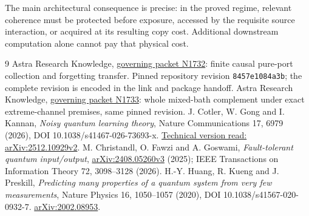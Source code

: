 \documentclass[11pt,a4paper]{article}
\begin{document}
The main architectural consequence is precise: in the proved regime, relevant coherence must be protected before exposure, accessed by the requisite source interaction, or acquired at its resulting copy cost. Additional downstream computation alone cannot pay that physical cost.

\begin{thebibliography}{9}
 Astra Research Knowledge, \href{https://github.com/harjassand/astra-research-knowledge/blob/8457e1084a3bcf3c4f8e3c7e4da9e0f5045a6570/knowledge/current/packets/N1732.json}{governing packet N1732}: finite causal pure-port collection and forgetting transfer. Pinned repository revision \texttt{8457e1084a3b}; the complete revision is encoded in the link and package handoff.
 Astra Research Knowledge, \href{https://github.com/harjassand/astra-research-knowledge/blob/8457e1084a3bcf3c4f8e3c7e4da9e0f5045a6570/knowledge/current/packets/N1733.json}{governing packet N1733}: whole mixed-bath complement under exact extreme-channel premises, same pinned revision.
 J. Cotler, W. Gong and I. Kannan, \emph{Noisy quantum learning theory}, Nature Communications 17, 6979 (2026), DOI 10.1038/s41467-026-73693-x. \href{https://arxiv.org/html/2512.10929v2}{Technical version read: arXiv:2512.10929v2}.
 M. Christandl, O. Fawzi and A. Goswami, \emph{Fault-tolerant quantum input/output}, \href{https://arxiv.org/abs/2408.05260}{arXiv:2408.05260v3} (2025); IEEE Transactions on Information Theory 72, 3098--3128 (2026).
 H.-Y. Huang, R. Kueng and J. Preskill, \emph{Predicting many properties of a quantum system from very few measurements}, Nature Physics 16, 1050--1057 (2020), DOI 10.1038/s41567-020-0932-7. \href{https://arxiv.org/abs/2002.08953}{arXiv:2002.08953}.
\end{thebibliography}
\end{document}
